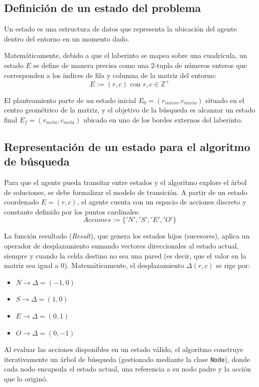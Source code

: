 \subsection{Definición de un estado del problema}
Un estado es una estructura de datos que representa la ubicación del agente dentro del entorno en un momento dado.

Matemáticamente, debido a que el laberinto se mapea sobre una cuadrícula, un estado $E$ se define de manera precisa como una 2-tupla de números enteros que corresponden a los índices de fila y columna de la matriz del entorno:
$$E := (r, c) \text{ con } r, c \in \mathbb{Z}^{+}$$

El planteamiento parte de un estado inicial $E_{0} = (r_{inicio}, c_{inicio})$ situado en el centro geométrico de la matriz, y el objetivo de la búsqueda es alcanzar un estado final $E_{f} = (r_{meta}, c_{meta})$ ubicado en uno de los bordes externos del laberinto.

\subsection{Representación de un estado para el algoritmo de búsqueda}
Para que el agente pueda transitar entre estados y el algoritmo explore el árbol de soluciones, se debe formalizar el modelo de transición. A partir de un estado coordenado $E = (r, c)$, el agente cuenta con un espacio de acciones discreto y constante definido por los puntos cardinales:
$$Acciones := \{'N', 'S', 'E', 'O'\}$$

La función resultado (\textit{Result}), que genera los estados hijos (sucesores), aplica un operador de desplazamiento sumando vectores direccionales al estado actual, siempre y cuando la celda destino no sea una pared (es decir, que el valor en la matriz sea igual a 0). Matemáticamente, el desplazamiento $\Delta(r,c)$ se rige por:
\begin{itemize}
    \item $N \rightarrow \Delta = (-1, 0)$
    \item $S \rightarrow \Delta = (1, 0)$
    \item $E \rightarrow \Delta = (0, 1)$
    \item $O \rightarrow \Delta = (0, -1)$
\end{itemize}

Al evaluar las acciones disponibles en un estado válido, el algoritmo construye iterativamente un árbol de búsqueda (gestionado mediante la clase \texttt{Node}), donde cada nodo encapsula el estado actual, una referencia a su nodo padre y la acción que lo originó.

